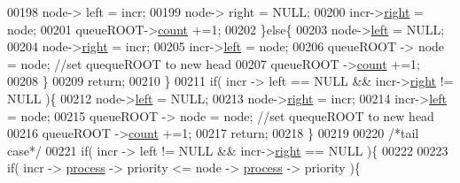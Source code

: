 \begin{DoxyCode}
{{00198                         node-> left = incr;
00199                         node-> right = NULL;
00200                         incr->\hyperlink{structpage_a59bb1b5eca2d579befcc93a2833f4dfd}{right} = node;
00201                         queueROOT->\hyperlink{structroot_afa78d0408d4af29e936332a04739d59c}{count} +=1;
00202                 \}\textcolor{keywordflow}{else}\{
00203                         node->\hyperlink{structpage_a450d16b8cb803158a4dab05bb36fd7f5}{left} = NULL;
00204                         node->\hyperlink{structpage_a59bb1b5eca2d579befcc93a2833f4dfd}{right} = incr;
00205                         incr->\hyperlink{structpage_a450d16b8cb803158a4dab05bb36fd7f5}{left} = node;
00206                         queueROOT -> node = node; \textcolor{comment}{//set quequeROOT to new head}
00207                         queueROOT ->\hyperlink{structroot_afa78d0408d4af29e936332a04739d59c}{count} +=1;
00208                 \}
00209                 \textcolor{keywordflow}{return};
00210         \}
00211         \textcolor{keywordflow}{if}( incr -> left == NULL && incr->\hyperlink{structpage_a59bb1b5eca2d579befcc93a2833f4dfd}{right} != NULL )\{ 
00212                 node->\hyperlink{structpage_a450d16b8cb803158a4dab05bb36fd7f5}{left} = NULL;
00213                 node->\hyperlink{structpage_a59bb1b5eca2d579befcc93a2833f4dfd}{right} = incr;
00214                 incr->\hyperlink{structpage_a450d16b8cb803158a4dab05bb36fd7f5}{left} = node;
00215                 queueROOT -> node = node; \textcolor{comment}{//set quequeROOT to new head}
00216                 queueROOT ->\hyperlink{structroot_afa78d0408d4af29e936332a04739d59c}{count} +=1;
00217                 \textcolor{keywordflow}{return};
00218         \}
00219         
00220         \textcolor{comment}{/*tail case*/}
00221         \textcolor{keywordflow}{if}( incr -> left != NULL && incr->\hyperlink{structpage_a59bb1b5eca2d579befcc93a2833f4dfd}{right} == NULL )\{
00222                 
00223                 \textcolor{keywordflow}{if}( incr -> \hyperlink{structprocess}{process} -> priority <= node -> \hyperlink{structprocess}{process} -> priority )\{
      
}}
\end{DoxyCode}
